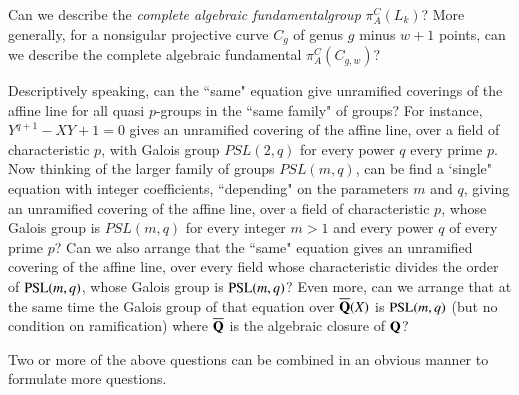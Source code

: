 \eject

\begin{question}\label{chap1-qus9.6}
Can we describe the \textit{complete algebraic fundamental\break group} $\pi^{C}_{A}(L_{k})$? More generally, for a nonsigular projective curve $C_{g}$ of genus $g$ minus $w+1$ points, can we describe the complete algebraic fundamental $\pi^{C}_{A}(C_{g,w})$?
\end{question}

\begin{question}\label{chap1-qus9.7}
Descriptively speaking, can the ``same" equation give unramified coverings of the affine line for all quasi $p$-groups in the ``same family" of groups? For instance, $Y^{q+1}-XY+1 =0$ gives an unramified covering of the affine line, over a field of characteristic $p$, with Galois group $PSL(2,q)$ for every power $q$ every prime $p$. Now thinking of the larger family of groups $PSL(m,q)$, can be find a `single" equation with integer coefficients, ``depending" on the parameters $m$ and $q$, giving an unramified covering of the affine line, over a field of characteristic $p$, whose Galois group is $PSL(m,q)$ for every integer $m>1$ and every power $q$ of every prime $p$? Can we also arrange that the ``same" equation gives an unramified covering of the affine line, over every field whose characteristic divides the order of $\operatorname{PSL}(m,q)$, whose Galois group is $\operatorname{PSL}(m,q)$? Even more, can we arrange that at the same time the Galois group of that equation over $\overline{\mathbf{Q}}(X)$ is $\operatorname{PSL}(m,q)$ (but no condition on ramification) where $\overline{\mathbf{Q}}$ is the algebraic closure of $\mathbf{Q}$?
\end{question}

\setcounter{note}{7}
\begin{note}\label{chap1-note9.8}
Two or more of the above questions can be combined in an obvious manner to formulate more questions.
\end{note}


